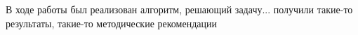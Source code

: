 ﻿
В ходе работы был реализован алгоритм, решающий задачу... получили такие-то результаты, такие-то методические рекомендации 